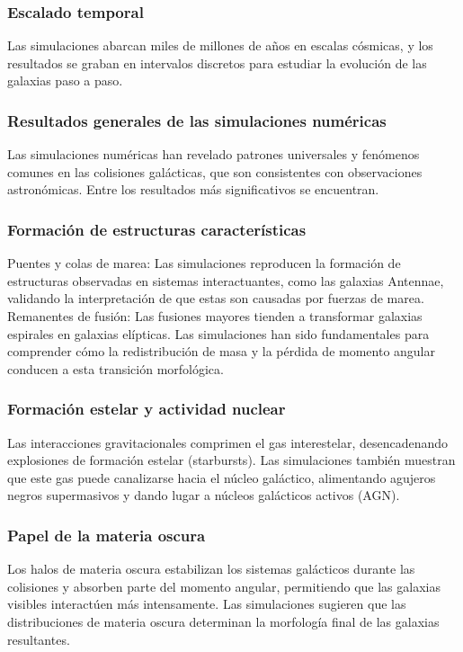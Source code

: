 \documentclass{article}
\begin{document}
\subsubsection*{Escalado temporal}
Las simulaciones abarcan miles de millones de años en escalas cósmicas, y los resultados se graban en intervalos discretos para estudiar la evolución de las galaxias paso a paso.

\subsubsection{Resultados generales de las simulaciones numéricas}
Las simulaciones numéricas han revelado patrones universales y fenómenos comunes en las colisiones galácticas, que son consistentes con observaciones astronómicas. Entre los resultados más significativos se encuentran.

\subsubsection*{Formación de estructuras características}

Puentes y colas de marea:
Las simulaciones reproducen la formación de estructuras observadas en sistemas interactuantes, como las galaxias Antennae, validando la interpretación de que estas son causadas por fuerzas de marea.
Remanentes de fusión:
Las fusiones mayores tienden a transformar galaxias espirales en galaxias elípticas. Las simulaciones han sido fundamentales para comprender cómo la redistribución de masa y la pérdida de momento angular conducen a esta transición morfológica.

\subsubsection*{Formación estelar y actividad nuclear}
Las interacciones gravitacionales comprimen el gas interestelar, desencadenando explosiones de formación estelar (starbursts). Las simulaciones también muestran que este gas puede canalizarse hacia el núcleo galáctico, alimentando agujeros negros supermasivos y dando lugar a núcleos galácticos activos (AGN).

\subsubsection*{Papel de la materia oscura}
Los halos de materia oscura estabilizan los sistemas galácticos durante las colisiones y absorben parte del momento angular, permitiendo que las galaxias visibles interactúen más intensamente. Las simulaciones sugieren que las distribuciones de materia oscura determinan la morfología final de las galaxias resultantes.
\end{document}
